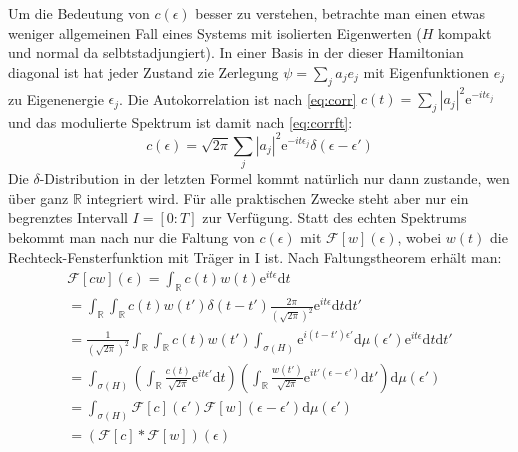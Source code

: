 \documentclass[10pt,a4paper,german]{scrartcl}
\begin{document}
		Um die Bedeutung von $c(\epsilon)$ besser zu verstehen, betrachte man einen
		etwas weniger allgemeinen Fall eines Systems mit isolierten Eigenwerten
		($H$ kompakt und normal da selbtstadjungiert). In einer Basis in der
		dieser Hamiltonian diagonal ist hat jeder Zustand zie Zerlegung
		$\psi=\sum_{j}{a_j e_j}$ mit Eigenfunktionen $e_j$ zu Eigenenergie $\epsilon_j$.
		Die Autokorrelation ist nach \eqref{eq:corr}
		$c(t)= \sum_{j} |a_j|^2 \mathrm{e}^{-i t \epsilon_j}$ und das modulierte Spektrum
		ist damit nach \eqref{eq:corrft}:
		\begin{equation}
			c(\epsilon)=\sqrt{2 \pi}
				 \sum_{j} |a_j|^2 \mathrm{e}^{-i t \epsilon_j} \delta(\epsilon-\epsilon')
		\end{equation}
		Die $\delta$-Distribution in der letzten Formel kommt natürlich nur dann zustande,
		wen über ganz $\mathbb{R}$ integriert wird. Für alle praktischen Zwecke steht
		aber nur ein begrenztes Intervall $I=[0:T]$ zur Verfügung. Statt des echten
		Spektrums	bekommt man nach nur die Faltung von $c(\epsilon)$ mit
		$\mathcal{F}[w](\epsilon)$,
		wobei $w(t)$ die Rechteck-Fensterfunktion mit Träger in I ist. Nach Faltungstheorem
		erhält man:
		\begin{multline}
			\mathcal{F}[c w](\epsilon)
				= \int_{\mathbb{R}} c(t) w(t) \mathrm{e}^{i t \epsilon} \mathrm{d}t \\
				= \int_{\mathbb{R}}
					 	\int_{\mathbb{R}}
					 		 c(t) w(t') \delta(t-t') \frac{2 \pi}{(\sqrt{2 \pi})^2}
					 		 	 \mathrm{e}^{i t \epsilon}
						\mathrm{d}t
					\mathrm{d}t'\\
				= \frac{1}{(\sqrt{2 \pi})^2} \int_{\mathbb{R}}
					 	\int_{\mathbb{R}}
					 		 c(t) w(t')
					 		   \int_{\sigma(H)} \mathrm{e}^{i (t - t')\epsilon'}
					 		   \mathrm{d}\mu(\epsilon')
					 		 	 \mathrm{e}^{i t \epsilon}
						\mathrm{d}t
					\mathrm{d}t'\\
				=
 		  	\int_{\sigma(H)}
					\left(\int_{\mathbb{R}}
						 \frac{c(t)}{\sqrt{2 \pi}} \mathrm{e}^{i t\epsilon'} \mathrm{d}t\right)
					\left(\int_{\mathbb{R}}
						\frac{w(t')}{\sqrt{2 \pi}}  \mathrm{e}^{i t' (\epsilon-\epsilon')}
							\mathrm{d}t'\right)
				\mathrm{d}\mu(\epsilon')\\
				= \int_{\sigma(H)}
	 		  		\mathcal{F}[c](\epsilon') \mathcal{F}[w](\epsilon-\epsilon')
					\mathrm{d}\mu(\epsilon')\\
				= (\mathcal{F}[c] * \mathcal{F}[w])(\epsilon)
		\end{multline}
\end{document}
